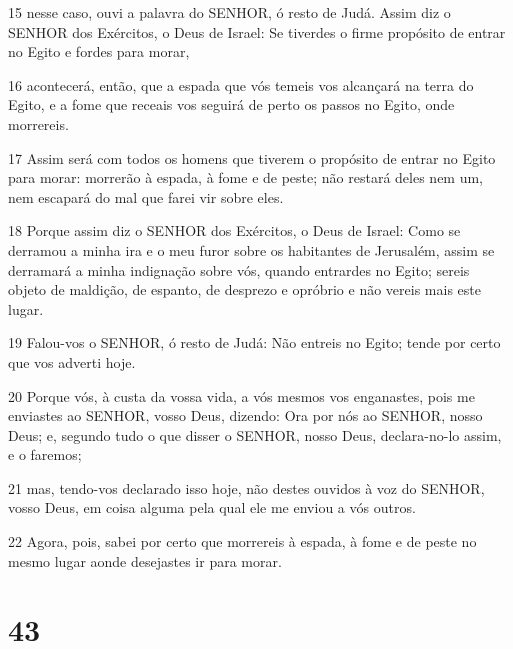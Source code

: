 \par 15 nesse caso, ouvi a palavra do SENHOR, ó resto de Judá. Assim diz o SENHOR dos Exércitos, o Deus de Israel: Se tiverdes o firme propósito de entrar no Egito e fordes para morar,
\par 16 acontecerá, então, que a espada que vós temeis vos alcançará na terra do Egito, e a fome que receais vos seguirá de perto os passos no Egito, onde morrereis.
\par 17 Assim será com todos os homens que tiverem o propósito de entrar no Egito para morar: morrerão à espada, à fome e de peste; não restará deles nem um, nem escapará do mal que farei vir sobre eles.
\par 18 Porque assim diz o SENHOR dos Exércitos, o Deus de Israel: Como se derramou a minha ira e o meu furor sobre os habitantes de Jerusalém, assim se derramará a minha indignação sobre vós, quando entrardes no Egito; sereis objeto de maldição, de espanto, de desprezo e opróbrio e não vereis mais este lugar.
\par 19 Falou-vos o SENHOR, ó resto de Judá: Não entreis no Egito; tende por certo que vos adverti hoje.
\par 20 Porque vós, à custa da vossa vida, a vós mesmos vos enganastes, pois me enviastes ao SENHOR, vosso Deus, dizendo: Ora por nós ao SENHOR, nosso Deus; e, segundo tudo o que disser o SENHOR, nosso Deus, declara-no-lo assim, e o faremos;
\par 21 mas, tendo-vos declarado isso hoje, não destes ouvidos à voz do SENHOR, vosso Deus, em coisa alguma pela qual ele me enviou a vós outros.
\par 22 Agora, pois, sabei por certo que morrereis à espada, à fome e de peste no mesmo lugar aonde desejastes ir para morar.

\chapter{43}

